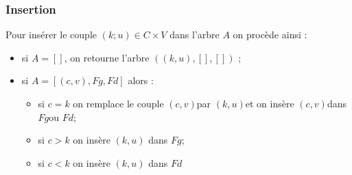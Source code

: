 \documentclass[letterpaper,10pt,english]{jupyterBook}
\begin{document}
\subsubsection{Insertion}
\label{\detokenize{notebooks/ABR/ABR:insertion}}
\sphinxAtStartPar
Pour insérer le couple \((k;u) \in C×V\) dans l’arbre \(A\) on procède ainsi :
\begin{itemize}
\item {} 
\sphinxAtStartPar
si \(A = [ ]\), on retourne l’arbre \(((k,u),[],[])\) ;

\item {} 
\sphinxAtStartPar
si \(A = [(c,v),Fg,Fd]\) alors :
\begin{itemize}
\item {} 
\sphinxAtStartPar
si \(c = k\) on remplace  le couple \((c,v)\)par \((k,u)\)et on insère \((c,v)\)dans \(Fg\)ou \(Fd\);

\item {} 
\sphinxAtStartPar
si \(c > k\) on insère \((k,u)\) dans \(Fg\);

\item {} 
\sphinxAtStartPar
si \(c < k\) on insère \((k,u)\) dans \(Fd\)

\end{itemize}

\end{itemize}
\begin{sphinxVerbatimInput}

\begin{sphinxVerbatim}[commandchars=\\\{\}]
 
     \PYG{p}{[}\PYG{p}{]}
        \PYG{p}{[}\PYG{p}{[}\PYG{p}{]}\PYG{p}{[}\PYG{p}{]}\PYG{p}{]}
     \PYG{p}{[}\PYG{p}{]}\PYG{p}{[}\PYG{p}{]}\PYG{p}{[}\PYG{p}{]}
        \PYG{p}{[}\PYG{p}{]}
        \PYG{p}{[}\PYG{p}{]}
\end{sphinxVerbatim}
\end{sphinxVerbatimInput}
\begin{sphinxVerbatimInput}

\begin{sphinxVerbatim}[commandchars=\\\{\}]
 
       
\end{sphinxVerbatim}
\end{sphinxVerbatimInput}
\end{document}
